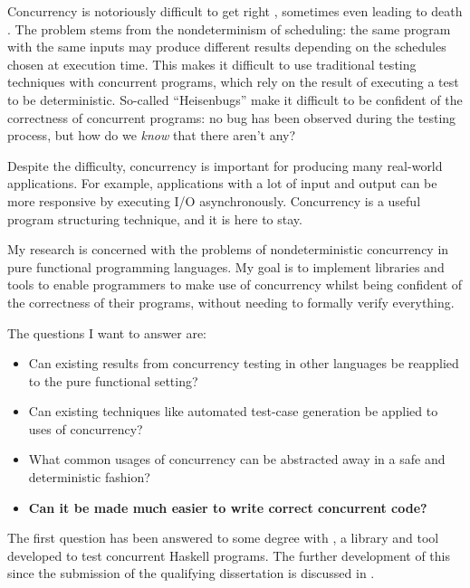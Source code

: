 Concurrency is notoriously difficult to get right \citep{overrated},
sometimes even leading to death \citep{therac25}. The problem stems
from the nondeterminism of scheduling: the same program with the same
inputs may produce different results depending on the schedules chosen
at execution time. This makes it difficult to use traditional testing
techniques with concurrent programs, which rely on the result of
executing a test to be deterministic. So-called ``Heisenbugs'' make it
difficult to be confident of the correctness of concurrent programs:
no bug has been observed during the testing process, but how do we
\emph{know} that there aren't any?

Despite the difficulty, concurrency is important for producing many
real-world applications. For example, applications with a lot of input
and output can be more responsive by executing I/O asynchronously.
Concurrency is a useful program structuring technique, and it is here
to stay.

My research is concerned with the problems of nondeterministic
concurrency in pure functional programming languages. My goal is to
implement libraries and tools to enable programmers to make use of
concurrency whilst being confident of the correctness of their
programs, without needing to formally verify everything.

The questions I want to answer are:

\begin{itemize}
\item Can existing results from concurrency testing in other languages
  be reapplied to the pure functional setting?

\item Can existing techniques like automated test-case generation be
  applied to uses of concurrency?

\item What common usages of concurrency can be abstracted away in a
  safe and deterministic fashion?

\item \textbf{Can it be made much easier to write correct concurrent
    code?}
\end{itemize}

The first question has been answered to some degree with \dejafu{}
\citep{dejafu}, a library and tool developed to test concurrent
Haskell programs. The further development of this since the submission
of the qualifying dissertation is discussed in .

